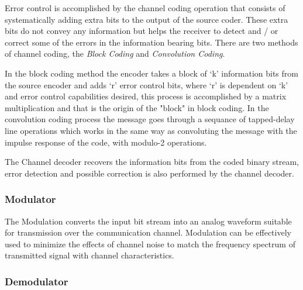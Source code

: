 Error control is accomplished by the channel coding operation that consists of
systematically adding extra bits to the output of the source coder. These extra
bits do not convey any information but helps the receiver to detect and / or
correct some of the errors in the information bearing bits. There are two
methods of channel coding, the \textit{Block Coding} and \textit{Convolution
Coding}.

In the block coding method the encoder takes a block of ‘k’ information bits
from the source encoder and adds ‘r’ error control bits, where ‘r’ is dependent
on ‘k’ and error control capabilities desired, this process is accomplished by a
matrix multiplication and that is the origin of the "block" in block coding. In
the convolution coding process the message goes through a sequance of
tapped-delay line operations which works in the same way as convoluting the
message with the impulse response of the code, with modulo-2 operations.

%
%
%


The Channel decoder recovers the information bits from the coded binary stream,
error detection and possible correction is also performed by the channel
decoder.

\subsubsection{Modulator}

The Modulation converts the input bit stream into an analog waveform suitable
for transmission over the communication channel. Modulation can be effectively
used to minimize the effects of channel noise to match the frequency spectrum of
transmitted signal with channel characteristics.

\subsubsection{Demodulator}

